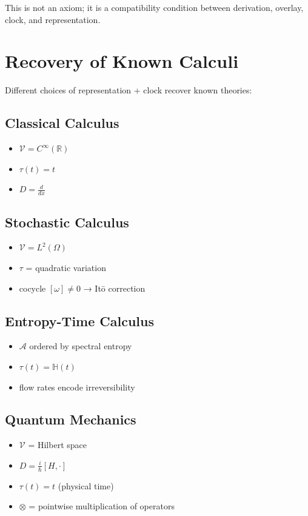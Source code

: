 \documentclass[12pt, oneside]{article}
\newcommand{\A}{\mathcal{A}}
\begin{document}
This is not an axiom; it is a compatibility condition between derivation, overlay, clock, and representation.

\section{Recovery of Known Calculi}

Different choices of representation + clock recover known theories:

\subsection{Classical Calculus}
\begin{itemize}
    \item $\mathcal{V} = C^\infty(\mathbb{R})$
    \item $\tau(t) = t$
    \item $D = \frac{d}{dx}$
\end{itemize}

\subsection{Stochastic Calculus}
\begin{itemize}
    \item $\mathcal{V} = L^2(\Omega)$
    \item $\tau$ = quadratic variation
    \item cocycle $[\omega] \neq 0$ → Itō correction
\end{itemize}

\subsection{Entropy-Time Calculus}
\begin{itemize}
    \item $\A$ ordered by spectral entropy
    \item $\tau(t) = \mathbb{H}(t)$
    \item flow rates encode irreversibility
\end{itemize}

\subsection{Quantum Mechanics}
\begin{itemize}
    \item $\mathcal{V}$ = Hilbert space
    \item $D = \frac{i}{\hbar}[H, \cdot]$
    \item $\tau(t) = t$ (physical time)
    \item $\otimes$ = pointwise multiplication of operators
\end{itemize}
\end{document}
